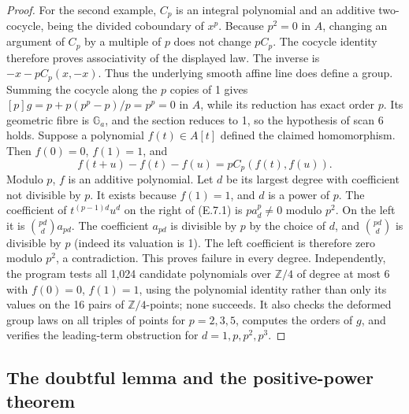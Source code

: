 \begin{proof}
For the second example, \(C_p\) is an integral polynomial and an
additive two-cocycle, being the divided coboundary of \(x^p\).
Because \(p^2=0\) in \(A\), changing an argument of \(C_p\) by
a multiple of \(p\) does not change \(pC_p\).  The cocycle identity
therefore proves associativity of the displayed law.  The inverse
is \(-x-pC_p(x,-x)\).  Thus the underlying smooth affine line
does define a group.  Summing the cocycle along the \(p\) copies
of 1 gives \([p]g=p+p(p^p-p)/p=p^p=0\) in \(A\), while its
reduction has exact order \(p\).  Its geometric fibre is \(\mathbb G_a\),
and the section reduces to 1, so the hypothesis of scan 6 holds.
Suppose a polynomial \(f(t)\in A[t]\) defined the claimed homomorphism.
Then \(f(0)=0\), \(f(1)=1\), and
\[
       f(t+u)-f(t)-f(u)=pC_p(f(t),f(u)).          \tag{E.7.1}
\]
Modulo \(p\), \(f\) is an additive polynomial.  Let \(d\) be its
largest degree with coefficient not divisible by \(p\).  It exists
because \(f(1)=1\), and \(d\) is a power of \(p\).  The coefficient
of \(t^{(p-1)d}u^d\) on the right of (E.7.1) is
\(pa_d^p\ne0\) modulo \(p^2\).  On the left it is
\(\binom{pd}d a_{pd}\).  The coefficient \(a_{pd}\) is divisible
by \(p\) by the choice of \(d\), and \(\binom{pd}d\) is divisible
by \(p\) (indeed its valuation is 1).  The left coefficient
is therefore zero modulo \(p^2\), a contradiction.  This proves failure
in every degree.  Independently, the program tests all 1,024 candidate
polynomials over \(\mathbb Z/4\) of degree at most 6 with
\(f(0)=0\), \(f(1)=1\), using
the polynomial identity rather than only its values on the 16 pairs
of \(\mathbb Z/4\)-points; none succeeds.  It also checks the
deformed group laws on all triples of points for \(p=2,3,5\),
computes the orders of \(g\), and verifies the leading-term
obstruction for \(d=1,p,p^2,p^3\).
\end{proof}

\subsection{The doubtful lemma and the positive-power theorem}

